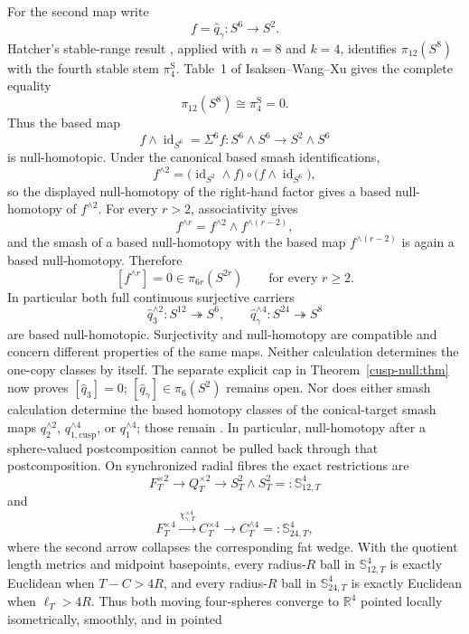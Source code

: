 \begin{auditrecord}
For the second map write
\[
 f=\widehat q_\gamma:S^6\longrightarrow S^2.
\]
Hatcher's stable-range result
\cite[Corollary~4.24, p.~360]{Hatcher2002}, applied with \(n=8\) and
\(k=4\), identifies
\(\pi_{12}(S^8)\) with the fourth stable stem
\(\pi_4^{\mathrm S}\).  Table~1 of Isaksen--Wang--Xu
\cite[p.~113]{IsaksenWangXu2023} gives the complete equality
\[
 \pi_{12}(S^8)\cong\pi_4^{\mathrm S}=0.
\]
Thus the based map
\[
 f\wedge\operatorname{id}_{S^6}=\Sigma^6f:
 S^6\wedge S^6\longrightarrow S^2\wedge S^6
\]
is null-homotopic.  Under the canonical based smash identifications,
\[
 f^{\wedge2}
 =\bigl(\operatorname{id}_{S^2}\wedge f\bigr)
  \circ\bigl(f\wedge\operatorname{id}_{S^6}\bigr),
\]
so the displayed null-homotopy of the right-hand factor gives a based
null-homotopy of \(f^{\wedge2}\).  For every \(r>2\), associativity gives
\[
 f^{\wedge r}=f^{\wedge2}\wedge f^{\wedge(r-2)},
\]
and the smash of a based null-homotopy with the based map
\(f^{\wedge(r-2)}\) is again a based null-homotopy.  Therefore
\[
 [f^{\wedge r}]=0\in\pi_{6r}(S^{2r})
 \qquad\text{for every }r\geq2.
\]
In particular both full continuous surjective carriers
\[
 \widehat q_3^{\wedge2}:S^{12}\twoheadrightarrow S^6,
 \qquad
 \widehat q_\gamma^{\wedge4}:S^{24}\twoheadrightarrow S^8
\]
are based null-homotopic.  Surjectivity and null-homotopy are compatible
and concern different properties of the same maps.  Neither calculation
determines the one-copy classes by itself. The separate explicit cap in
Theorem~\ref{cusp-null:thm} now proves \([\widehat q_3]=0\);
\([\widehat q_\gamma]\in\pi_6(S^2)\) remains open. Nor does either smash calculation
determine the based homotopy classes of the conical-target smash maps
\(q_2^{\wedge2}\), \(q_{1,\mathrm{cusp}}^{\wedge4}\), or
\(q_1^{\wedge4}\); those remain \Open.  In particular, null-homotopy after
a sphere-valued postcomposition cannot be pulled back through that
postcomposition.
On synchronized radial fibres the exact restrictions are
\[
 F_T^{\times2}\longrightarrow Q_T^{\times2}\longrightarrow
 S_T^2\wedge S_T^2=:\mathbb S_{12,T}^4
\]
and
\[
 F_T^{\times4}\xrightarrow{\chi_{\gamma,T}^{\times4}}
 C_T^{\times4}\longrightarrow
 C_T^{\wedge4}=:\mathbb S_{24,T}^4,
\]
where the second arrow collapses the corresponding fat wedge.  With the
quotient length metrics and midpoint basepoints, every radius-\(R\) ball in
\(\mathbb S_{12,T}^4\) is exactly Euclidean when \(T-C>4R\), and every
radius-\(R\) ball in \(\mathbb S_{24,T}^4\) is exactly Euclidean when
\(\ell_T>4R\).  Thus both moving four-spheres converge to \(\mathbb R^4\)
pointed locally isometrically, smoothly, and in pointed

\end{auditrecord}

